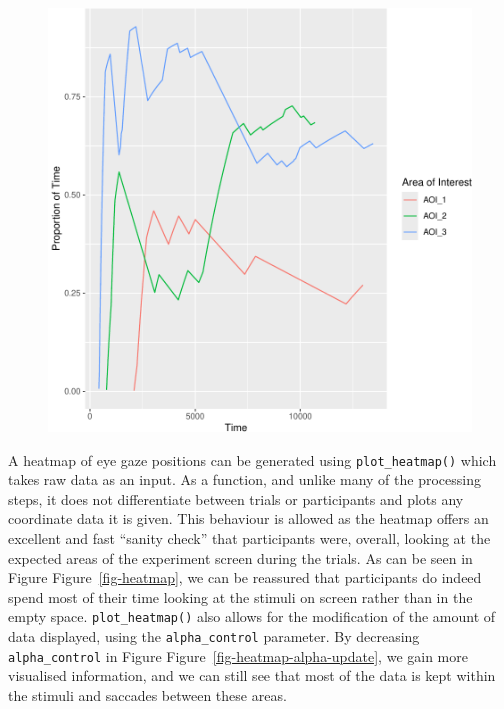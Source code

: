 \documentclass[
  man,
  floatsintext,
  longtable,
  nolmodern,
  notxfonts,
  notimes,
  colorlinks=true,linkcolor=blue,citecolor=blue,urlcolor=blue]{apa7}
\begin{document}
\begin{figure}[H]
\begin{minipage}{0.50\linewidth}
{\includegraphics{BRM_ms_files/figure-pdf/fig-prop-1.pdf}

}

\end{minipage}%

\end{figure}%

A heatmap of eye gaze positions can be generated using
\texttt{plot\_heatmap()} which takes raw data as an input. As a
function, and unlike many of the processing steps, it does not
differentiate between trials or participants and plots any coordinate
data it is given. This behaviour is allowed as the heatmap offers an
excellent and fast ``sanity check'' that participants were, overall,
looking at the expected areas of the experiment screen during the
trials. As can be seen in Figure Figure~\ref{fig-heatmap}, we can be
reassured that participants do indeed spend most of their time looking
at the stimuli on screen rather than in the empty space.
\texttt{plot\_heatmap()} also allows for the modification of the amount
of data displayed, using the \texttt{alpha\_control} parameter. By
decreasing \texttt{alpha\_control} in Figure
Figure~\ref{fig-heatmap-alpha-update}, we gain more visualised
information, and we can still see that most of the data is kept within
the stimuli and saccades between these areas.
\end{document}
